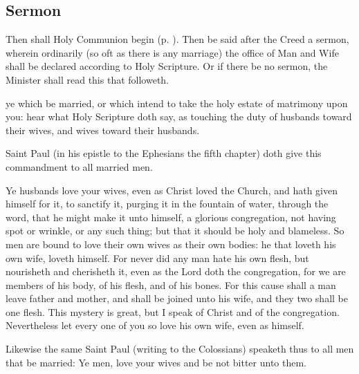 

\subsection{Sermon}
\begin{rubric}
	Then shall Holy Communion begin (p. \pageref{MatrimonyMass}). Then be said after the Creed a sermon, wherein ordinarily (so oft as there is any marriage) the office of Man and Wife shall be declared according to Holy Scripture. Or if there be no sermon, the Minister shall read this that followeth.
\end{rubric}
 ye which be married, or which intend to take the holy estate of matrimony upon you: hear what Holy Scripture doth say, as touching the duty of husbands toward their wives, and wives toward their husbands.\par
    Saint Paul (in his epistle to the Ephesians the fifth chapter) doth give this commandment to all married men.\par
    Ye husbands love your wives, even as Christ loved the Church, and hath given himself for it, to sanctify it, purging it in the fountain of water, through the word, that he might make it unto himself, a glorious congregation, not having spot or wrinkle, or any such thing; but that it should be holy and blameless. So men are bound to love their own wives as their own bodies: he that loveth his own wife, loveth himself. For never did any man hate his own flesh, but nourisheth and cherisheth it, even as the Lord doth the congregation, for we are members of his body, of his flesh, and of his bones. For this cause shall a man leave father and mother, and shall be joined unto his wife, and they two shall be one flesh. This mystery is great, but I speak of Christ and of the congregation. Nevertheless let every one of you so love his own wife, even as himself.\par
    Likewise the same Saint Paul (writing to the Colossians) speaketh thus to all men that be married: Ye men, love your wives and be not bitter unto them.\par
